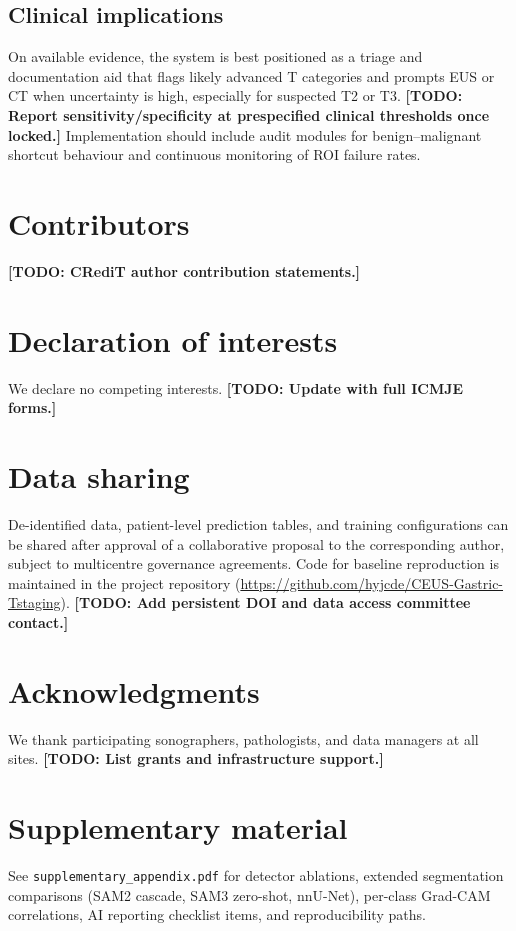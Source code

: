 \documentclass[11pt,a4paper]{article}
\newcommand{\todo}[1]{\textbf{[TODO: #1]}}
\begin{document}
\subsection{Clinical implications}
On available evidence, the system is best positioned as a triage and documentation aid that flags likely advanced T categories and prompts EUS or CT when uncertainty is high, especially for suspected T2 or T3. \todo{Report sensitivity/specificity at prespecified clinical thresholds once locked.} Implementation should include audit modules for benign--malignant shortcut behaviour and continuous monitoring of ROI failure rates.

\section{Contributors}
\todo{CRediT author contribution statements.}

\section{Declaration of interests}
We declare no competing interests. \todo{Update with full ICMJE forms.}

\section{Data sharing}
De-identified data, patient-level prediction tables, and training configurations can be shared after approval of a collaborative proposal to the corresponding author, subject to multicentre governance agreements. Code for baseline reproduction is maintained in the project repository (\url{https://github.com/hyjcde/CEUS-Gastric-Tstaging}). \todo{Add persistent DOI and data access committee contact.}

\section{Acknowledgments}
We thank participating sonographers, pathologists, and data managers at all sites. \todo{List grants and infrastructure support.}

\section{Supplementary material}
See \texttt{supplementary\_appendix.pdf} for detector ablations, extended segmentation comparisons (SAM2 cascade, SAM3 zero-shot, nnU-Net), per-class Grad-CAM correlations, AI reporting checklist items, and reproducibility paths.



\end{document}
